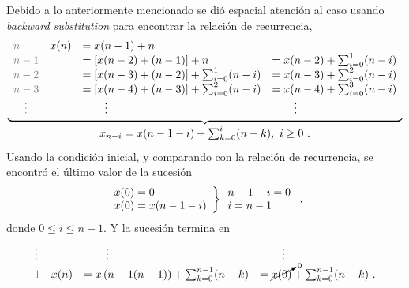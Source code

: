 \begin{enumerate}[label=\textbf{\alph*.}]
\begin{solution}
        Debido a lo anteriormente mencionado se dió espacial atención al caso usando \textit{backward substitution} para encontrar la relación de recurrencia, 
        \begin{equation*}
            \underbrace{%
            \begin{array}{l l l l}
                \txtgray{n} & x(n) & = x(n - 1) + n & \\
                \txtgray{n - 1} & & = \left[x(n - 2) + (n - 1)\right] + n & = x(n - 2) + \sum_{i=0}^{1} (n - i) \\
                \txtgray{n - 2} & & = \left[x(n - 3) + (n - 2)\right] + \sum_{i=0}^{1} (n - i) & = x(n - 3) + \sum_{i=0}^{2} (n - i) \\
                \txtgray{n - 3} & & = \left[x(n - 4) + (n - 3)\right] + \sum_{i=0}^{2} (n - i) & = x(n - 4) + \sum_{i=0}^{3} (n - i) \\
                \quad\txtgray\vdots & & \qquad \vdots & \qquad \vdots
            \end{array}}_{%
            \begin{array}{c}
                x_{n - i} = x(n - 1 - i) + \sum_{k=0}^{i} (n - k),\ i \geq 0 \ .
            \end{array}}
        \end{equation*}
        Usando la condición inicial, y comparando con la relación de recurrencia, se encontró el último valor de la sucesión
        \begin{equation*}
            \begin{rcases}
                \begin{array}{l}
                    x(0) = 0 \\
                    x(0) = x(n - 1 - i)
                \end{array}
            \end{rcases}
            \begin{array}{l}
                n - 1 - i = 0 \\
                i = n - 1
            \end{array}\ ,
        \end{equation*}
        donde $0 \leq i \leq n - 1$. Y la sucesión termina en
        \begin{equation*}
            \begin{array}{l l l l}
                \txtgray\vdots & & \qquad \vdots & \qquad \vdots \\
                \txtgray{1} & x(n) & = x\left(n - 1 (n - 1)\right) + \sum_{k=0}^{n-1} (n - k) & = \cancelto{0}{x(0)} + \sum_{k=0}^{n-1} (n - k)\ .
            \end{array}
        \end{equation*}


\end{solution}
\end{enumerate}

